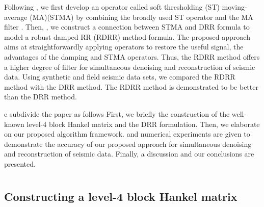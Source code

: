 Following \citet{chen2016simultaneous}, we first develop an operator called soft thresholding (ST) moving-average (MA)(STMA) by combining the broadly used ST operator \citep{donoho1995noising,daubechies2004iterative,candes2006robust} and the MA filter \citep{schafer1989discrete}. Then, , we construct a connection between STMA  and DRR formula to model a robust damped RR (RDRR) method formula. The proposed approach aims at straightforwardly applying  operators to restore the useful signal,  the advantages of the damping and STMA operators. Thus, the RDRR method offers a higher degree of filter for simultaneous denoising and reconstruction of  seismic data. Using synthetic and field  seismic data sets, we compared the RDRR method with the DRR method. The RDRR method is demonstrated to be better than the DRR method.

e subdivide the paper as follows\dlo{:} First, we briefly  the construction of the well-known level-4 block Hankel matrix and the DRR formulation. Then, we elaborate on our proposed algorithm framework.  and numerical experiments are given to demonstrate the accuracy of our proposed approach for simultaneous denoising and reconstruction of  seismic data. Finally, a
discussion and our conclusions are presented.

\section{}
\subsection{Constructing a level-4 block Hankel matrix} 

